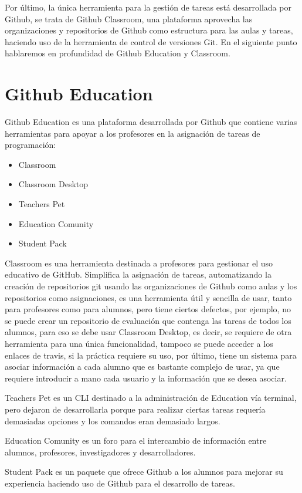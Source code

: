 Por último, la única herramienta para la gestión de tareas está desarrollada por Github, se trata de Github Classroom, una plataforma aprovecha las organizaciones y repositorios de Github como estructura para las aulas y tareas, haciendo uso de la herramienta de control de versiones Git. En el siguiente punto hablaremos en profundidad de Github Education y Classroom.


\section{Github Education}
\label{1:sec:2}

Github Education es una plataforma desarrollada por Github que contiene varias herramientas para apoyar a los profesores en la asignación de tareas de programación:

\begin{itemize}
  \item Classroom
  \item Classroom Desktop
  \item Teachers Pet  
  \item Education Comunity
  \item Student Pack
\end{itemize}

Classroom es una herramienta destinada a profesores para gestionar el uso educativo de GitHub. Simplifica la asignación de tareas, automatizando la creación de repositorios git usando las organizaciones de Github como aulas y los repositorios como asignaciones, es una herramienta útil y sencilla de usar, tanto para profesores como para alumnos, pero tiene ciertos defectos, por ejemplo, no se puede crear un repositorio de evaluación que contenga las tareas de todos los alumnos, para eso se debe usar Classroom Desktop, es decir, se requiere de otra herramienta para una única funcionalidad, tampoco se puede acceder a los enlaces de travis, si la práctica requiere su uso, por último, tiene un sistema para asociar información a cada alumno que es bastante complejo de usar, ya que requiere introducir a mano cada usuario y la información que se desea asociar.

Teachers Pet es un CLI destinado a la administración de Education vía terminal, pero dejaron de desarrollarla porque para realizar ciertas tareas requería demasiadas opciones y los comandos eran demasiado largos.

Education Comunity es un foro para el intercambio de información entre alumnos, profesores, investigadores y desarrolladores.

Student Pack es un paquete que ofrece Github a los alumnos para mejorar su experiencia haciendo uso de Github para el desarrollo de tareas.
